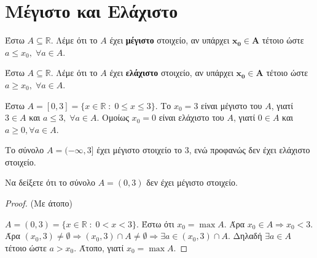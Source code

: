 \section{Μέγιστο και Ελάχιστο}

\begin{mybox1}
\begin{dfn}
  Έστω $ A \subseteq \mathbb{R} $. Λέμε ότι το $A$ έχει \textbf{μέγιστο} στοιχείο, 
  αν υπάρχει $ \bm{x_{0} \in A} $ τέτοιο ώστε $ a \leq x_{0}, \; \forall a \in A $.
\end{dfn}
\end{mybox1}

\begin{mybox1}
\begin{dfn}
  Έστω $ A \subseteq \mathbb{R} $. Λέμε ότι το $A$ έχει \textbf{ελάχιστο} στοιχείο, 
  αν υπάρχει $ \bm{x_{0} \in A} $ τέτοιο ώστε $ a \geq x_{0}, \; \!\! \forall a \in A$.
\end{dfn}
\end{mybox1}

\begin{example}
  Έστω $ A = [0,3] = \{ x \in \mathbb{R} \; : \; 0 \leq x \leq 3 \} $. 
  Το $ x_{0}= 3 $ είναι μέγιστο του $A$, γιατί $ 3 \in A $ και 
  $ a \leq 3, \; \forall a \in A $. Ομοίως $ x_{0}= 0 $ είναι ελάχιστο 
  του $A$, γιατί $ 0 \in A $ και $ a \geq 0, \forall a \in A $.
\end{example}

\begin{example}
  Το σύνολο $ A=(- \infty, 3] $ έχει μέγιστο στοιχείο το 3, ενώ προφανώς δεν έχει 
  ελάχιστο στοιχείο.
\end{example}

\begin{example}
  Να δείξετε ότι το σύνολο $ A = (0,3) $ δεν έχει μέγιστο στοιχείο.
\end{example}
\begin{proof}(Με άτοπο)
\item {}
  $ A = (0,3) = \{ x \in \mathbb{R} \; : \; 0 < x < 3 \} $. 
  Έστω ότι $ x_{0} = \max A $. Άρα $ x_{0} \in A \Rightarrow  x_{0} 
  < 3$. Άρα  $ (x_{0}, 3) \neq \emptyset \Rightarrow (x_{0},3) \cap A \neq 
  \emptyset \Rightarrow \exists a \in (x_{0},3) \cap A $. Δηλαδή $ 
  \exists a \in A$ τέτοιο ώστε $ a > x_{0} $. Άτοπο, γιατί $ x_{0}= \max A $.
\end{proof}

